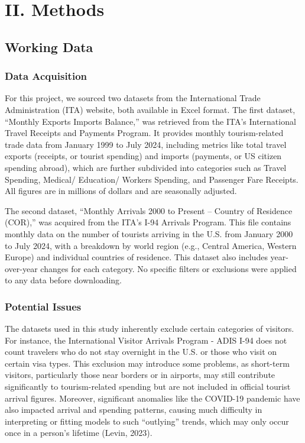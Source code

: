 \documentclass[11pt]{article}
\begin{document}
\section{II. Methods}

\subsection{Working Data}

\subsubsection{Data Acquisition}

For this project, we sourced two datasets from the International Trade Administration (ITA) website, both available in Excel format. The first dataset, ``Monthly Exports Imports Balance,'' was retrieved from the ITA's International Travel Receipts and Payments Program. It provides monthly tourism-related trade data from January 1999 to July 2024, including metrics like total travel exports (receipts, or tourist spending) and imports (payments, or US citizen spending abroad), which are further subdivided into categories such as Travel Spending, Medical/ Education/ Workers Spending, and Passenger Fare Receipts. All figures are in millions of dollars and are seasonally adjusted.

The second dataset, ``Monthly Arrivals 2000 to Present -- Country of Residence (COR),'' was acquired from the ITA's I-94 Arrivals Program. This file contains monthly data on the number of tourists arriving in the U.S. from January 2000 to July 2024, with a breakdown by world region (e.g., Central America, Western Europe) and individual countries of residence. This dataset also includes year-over-year changes for each category. No specific filters or exclusions were applied to any data before downloading.

\subsubsection{Potential Issues}

The datasets used in this study inherently exclude certain categories of visitors. For instance, the International Visitor Arrivals Program - ADIS I-94 does not count travelers who do not stay overnight in the U.S. or those who visit on certain visa types. This exclusion may introduce some problems, as short-term visitors, particularly those near borders or in airports, may still contribute significantly to tourism-related spending but are not included in official tourist arrival figures. Moreover, significant anomalies like the COVID-19 pandemic have also impacted arrival and spending patterns, causing much difficulty in interpreting or fitting models to such ``outlying'' trends, which may only occur once in a person's lifetime (Levin, 2023).
\end{document}
